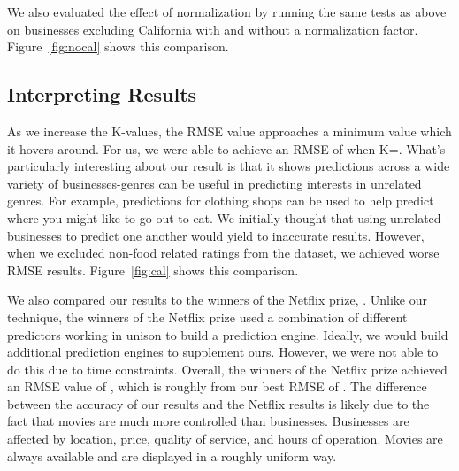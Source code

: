 We also evaluated the effect of normalization by running the same tests as
above on businesses excluding California with and without a normalization
factor. Figure~\ref{fig:nocal} shows this comparison.

\subsection{Interpreting Results}
As we increase the K-values, the RMSE value approaches a minimum value which it
hovers around. For us, we were able to achieve an RMSE of \bestRMSE when
K=\bestK.
What's particularly interesting about our result is that it shows predictions
across a wide variety of businesses-genres can be useful in predicting
interests in unrelated genres. For example, predictions for clothing shops can
be used to help predict where you might like to go out to eat. We initially
thought that using unrelated businesses to predict one another would yield to
inaccurate results. However, when we excluded non-food related ratings from the
dataset, we achieved worse RMSE results. Figure~\ref{fig:cal} shows this comparison.

We also compared our results to the winners of the Netflix prize,
\cite{netprize}. Unlike our technique, the winners of the Netflix prize used a
combination of different predictors working in unison to build a prediction
engine. Ideally, we would build additional prediction engines to supplement
ours. However, we were not able to do this due to time constraints. Overall,
the winners of the Netflix prize achieved an RMSE value of \bestNetflixRMSEnsp,
which is roughly \netDiff from our best RMSE of \bestRMSEnsp. The difference
between the accuracy of our results and the Netflix results is likely due to
the fact that movies are much more controlled than businesses. Businesses are
affected by location, price, quality of service, and hours of operation. Movies
are always available and are displayed in a roughly uniform way. 


